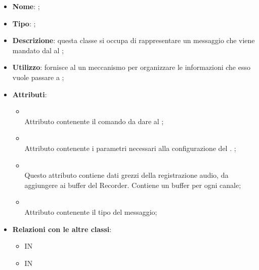 \begin{itemize}
	\item \textbf{Nome}: ;
	\item \textbf{Tipo}: ;
	\item \textbf{Descrizione}: questa classe si occupa di rappresentare un messaggio che viene mandato dal  al ;
	\item \textbf{Utilizzo}: fornisce al  un meccanismo per organizzare le informazioni che esso vuole passare a ;
	\item \textbf{Attributi}:
	\begin{itemize}
		\item[]  \\
		Attributo contenente il comando da dare al ;
		\item[]  \\
		Attributo contenente i parametri necessari alla configurazione del . ;
		\item[]  \\
		Questo attributo contiene dati grezzi della registrazione audio, da aggiungere ai buffer del Recorder. Contiene un buffer per ogni canale;
		\item[]  \\
		Attributo contenente il tipo del messaggio;
	\end{itemize}
	\item \textbf{Relazioni con le altre classi}:
	\begin{itemize}
		\item IN \hyperlink{RecorderWorker_label}{}
		\item IN \hyperlink{Recorder_label}{}
	\end{itemize}
\end{itemize}


